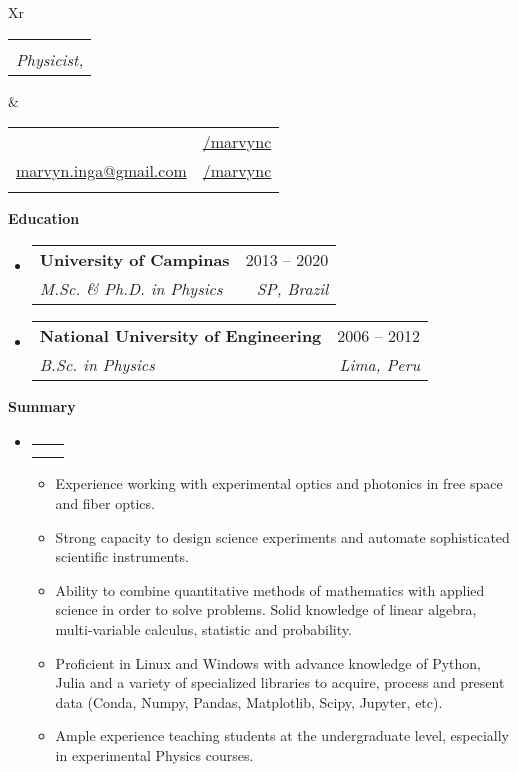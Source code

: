 \documentclass[letterpaper,12pt]{article}[leftmargin=*]
\makeatletter
\def \fullname {Marvyn Inga}
\def \subtitle {Physicist, \faMale}
\def \linkedinicon {\faLinkedin}
\def \linkedinlink {https://www.linkedin.com/in/marvync/}
\def \linkedintext {/marvync}
\def \phoneicon {\faPhone}
\def \phonetext {+55-19-983638657}
\def \emailicon {\faEnvelope}
\def \emaillink {mailto:marvyn.inga@gmail.com}
\def \emailtext {marvyn.inga@gmail.com}
\def \githubicon {\faGithub}
\def \githublink {https://github.com/marvync}
\def \githubtext {/marvync}
\def \headertype {\doublecol} %
\def \entryspacing {-0pt}
\def \linkedin {\linkedinicon \hspace{3pt}\href{\linkedinlink}{\linkedintext}}
\def \phone {\phoneicon \hspace{3pt}{ \phonetext}}
\def \email {\emailicon \hspace{3pt}\href{\emaillink}{\emailtext}}
\def \github {\githubicon \hspace{3pt}\href{\githublink}{\githubtext}}
\renewcommand{\section}[2]{\vspace{5pt}
  \colorbox{secondary}{\color{white}\raggedbottom\normalsize\textbf{{#1}{\hspace{7pt}#2}}}
}
\newcommand{\resumeEntryStart}{\begin{itemize}[leftmargin=2.5mm]}
\newcommand{\resumeEntryEnd}{\end{itemize}\vspace{\entryspacing}}
\newcommand{\resumeItemListStart}{\begin{itemize}[leftmargin=4.5mm]}
\newcommand{\resumeItemListEnd}{\end{itemize}}
\newcommand{\resumeItem}[1]{
  \item\small{
    {#1 \vspace{-2pt}}
  }
}
\newcommand{\resumeEntryTSDL}[4]{
  \vspace{-1pt}\item[]
    \begin{tabularx}{0.97\textwidth}{X@{\hspace{60pt}}r}
      \textbf{\color{primary}#1} & {\firabook\color{accent}\small#2} \\
      \textit{\color{accent}\small#3} & \textit{\color{accent}\small#4} \\
    \end{tabularx}\vspace{-6pt}
}
\newcommand{\doublecol}[6]{
  \begin{tabularx}{\textwidth}{Xr}
    {
      \begin{tabular}[c]{l}
        \fontsize{35}{45}\selectfont{\color{primary}{{\textbf{\fullname}}}} \\
        {\textit{\subtitle}} %
      \end{tabular}
    } & {
      \begin{tabular}[c]{l@{\hspace{1.5em}}l}
        {\small#4} & {\small#1} \\
        {\small#5} & {\small#2} \\
        {\small#6} & {\small#3}
      \end{tabular}
    }
  \end{tabularx}
}
\newcommand{\singlecol}[6]{
  \begin{tabularx}{\textwidth}{Xr}
    {
      \begin{tabular}[b]{l}
        \fontsize{35}{45}\selectfont{\color{primary}{{\textbf{\fullname}}}} \\
        {\textit{\subtitle}} %
      \end{tabular}
    } & {
      \begin{tabular}[c]{l}
        {\small#1} \\
        {\small#2} \\
        {\small#3} \\
        {\small#4} \\
        {\small#5} \\
        {\small#6}
      \end{tabular}
    }
  \end{tabularx}
}
\makeatother
\begin{document}


\headertype{\linkedin}{\github}{}{\phone}{\email}{} %

\section{\faGraduationCap}{Education}
\vspace{-0.05cm}
\resumeEntryStart
	\resumeEntryTSDL
    {University of Campinas}{2013 -- 2020}
	{M.Sc. \& Ph.D. in Physics}{SP, Brazil}
\resumeEntryEnd

\vspace{-0.4cm}

\resumeEntryStart
	\resumeEntryTSDL
	{National University of Engineering}{2006 -- 2012}
	{B.Sc. in Physics}{Lima, Peru}
\resumeEntryEnd
\vspace{-0.2cm}

\section{\faFolderOpen}{Summary}
\vspace{-1.3cm}

\resumeEntryStart
\resumeEntryTSDL
{}{}
{}{}
\resumeItemListStart
\resumeItem {Experience working with experimental optics and photonics in free space and fiber optics.}
\resumeItem {Strong capacity to design science experiments and automate sophisticated scientific instruments.}
\resumeItem {Ability to combine quantitative methods of mathematics with applied science in order to solve problems. Solid knowledge of linear algebra, multi-variable calculus, statistic and probability.}
\resumeItem {Proficient in Linux and Windows with advance knowledge of Python, Julia and a variety of specialized libraries to acquire, process and present data (Conda, Numpy, Pandas, Matplotlib, Scipy, Jupyter, etc).}
\resumeItem {Ample experience teaching students at the undergraduate level, especially in experimental Physics courses.}
\resumeItemListEnd
\resumeEntryEnd
\vspace{-0.2cm}
\end{document}
